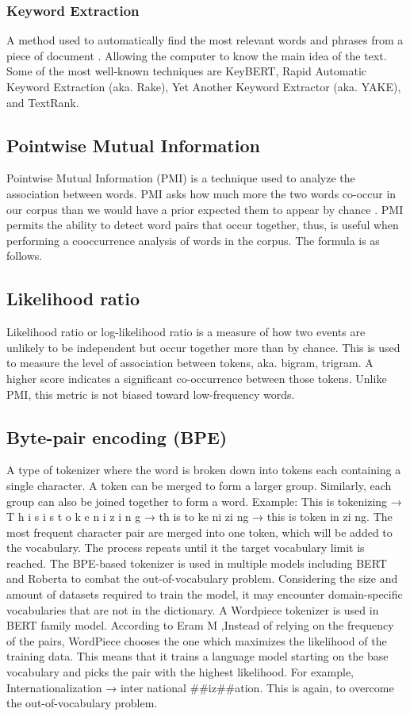 \documentclass[12pt,oneside,openright,a4paper]{cpe-english-project}
\begin{document}
\subsubsection{Keyword Extraction}
A method used to automatically find the most relevant words and phrases from a piece of document \cite{f}. Allowing the computer to know the main idea of the text. Some of the most well-known techniques are KeyBERT, Rapid Automatic Keyword Extraction (aka. Rake), Yet Another Keyword Extractor (aka. YAKE), and TextRank.

\subsection{Pointwise Mutual Information}
Pointwise Mutual Information (PMI) is a technique used to analyze the association between words. PMI asks how much more the two words co-occur in our corpus than we would have a prior expected them to appear by chance \cite{e}. PMI permits the ability to detect word pairs that occur together, thus, is useful when performing a cooccurrence analysis of words in the corpus. The formula is as follows.

\subsection{Likelihood ratio}
	 Likelihood ratio or log-likelihood ratio is a measure of how two events are unlikely to be independent but occur together more than by chance. This is used to measure the level of association between tokens, aka. bigram, trigram. A higher score indicates a significant co-occurrence between those tokens. Unlike PMI, this metric is not biased toward low-frequency words.

\subsection{Byte-pair encoding (BPE)}
A type of tokenizer where the word is broken down into tokens each containing a single character. A token can be merged to form a larger group. Similarly, each group can also be joined together to form a word. Example: This is tokenizing → T h i s i s t o k e n i z i n g → th is to ke ni zi ng → this is token in zi ng. The most frequent character pair are merged into one token, which will be added to the vocabulary.  The process repeats until it the target vocabulary limit is reached.
The BPE-based tokenizer is used in multiple models including BERT and Roberta to combat the out-of-vocabulary problem. Considering the size and amount of datasets required to train the model, it  may encounter domain-specific vocabularies that are not in the dictionary.
A Wordpiece tokenizer is used in BERT family model. According to Eram M \cite{x},Instead of relying on the frequency of the pairs, WordPiece chooses the one which maximizes the likelihood of the training data. This means that it trains a language model starting on the base vocabulary and picks the pair with the highest likelihood. For example, Internationalization
→ inter national \#\#iz\#\#ation. This is again, to overcome the out-of-vocabulary problem.
\end{document}
